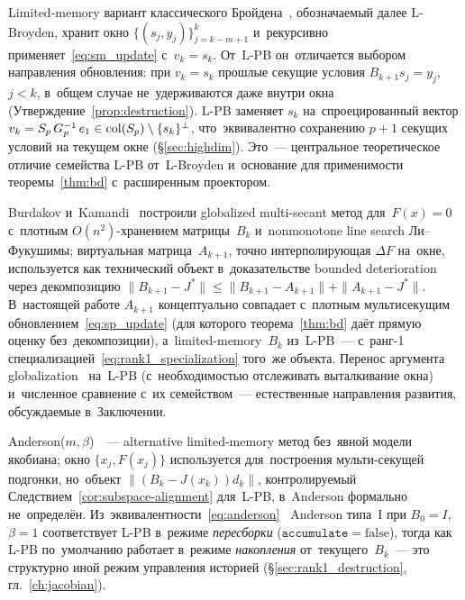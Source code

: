 \begin{remark}\label{rem:lpb_vs_lbroyden}
Limited-memory вариант классического Бройдена~\cite{byrd1994}, обозначаемый
далее L-Broyden, хранит окно $\{(s_j,y_j)\}_{j=k-m+1}^{k}$ и~рекурсивно
применяет~\eqref{eq:sm_update} с~$v_k=s_k$. От~L-PB он~отличается выбором
направления обновления: при $v_k=s_k$ прошлые секущие условия
$B_{k+1} s_j = y_j$, $j<k$, в~общем случае не~удерживаются даже внутри
окна (Утверждение~\ref{prop:destruction}). L-PB заменяет $s_k$ на~спроецированный
вектор $v_k = S_p\,G_p^{-1}\,e_1\in\operatorname{col}(S_p)\setminus\{s_k\}^{\perp}$,
что~эквивалентно сохранению $p+1$ секущих условий на текущем окне
(\S\ref{sec:highdim}). Это~--- центральное теоретическое отличие
семейства L-PB от~L-Broyden и~основание для применимости
теоремы~\ref{thm:bd} с~расширенным проектором.
\end{remark}

\begin{remark}\label{rem:lpb_vs_burdakov}
Burdakov и~Kamandi~\cite{burdakov2018} построили globalized multi-secant
метод для~$F(x)=0$ с~плотным $O(n^2)$-хранением матрицы~$B_k$ и~nonmonotone
line search Ли--Фукушимы; виртуальная матрица~$A_{k+1}$, точно
интерполирующая $\Delta F$ на~окне, используется как технический объект
в~доказательстве bounded deterioration через декомпозицию
$\|B_{k+1}-J^*\|\le \|B_{k+1}-A_{k+1}\| + \|A_{k+1}-J^*\|$. В~настоящей
работе $A_{k+1}$ концептуально совпадает с~плотным мультисекущим
обновлением~\eqref{eq:sp_update} (для которого теорема~\ref{thm:bd} даёт
прямую оценку без~декомпозиции), а~limited-memory~$B_k$ из~L-PB~---
с~ранг-1 специализацией~\eqref{eq:rank1_specialization} того~же объекта.
Перенос аргумента globalization~\cite{burdakov2018}
на~L-PB (с~необходимостью отслеживать выталкивание окна) и~численное
сравнение с~их семейством~--- естественные направления развития,
обсуждаемые в~Заключении.
\end{remark}

\begin{remark}\label{rem:lpb_vs_anderson}
Anderson($m,\beta$)~\cite{anderson1965,walker2011,toth2015}~--- alternative
limited-memory метод без~явной модели якобиана; окно $\{x_j,F(x_j)\}$
используется для~построения мульти-секущей подгонки, но~объект $\|(B_k-J(x_k))d_k\|$,
контролируемый Следствием~\ref{cor:subspace-alignment} для~L-PB, в~Anderson
формально не~определён. Из~эквивалентности~\eqref{eq:anderson}~\cite{walker2011,fang2009}
Anderson типа~I при $B_0=I$, $\beta=1$ соответствует L-PB в~режиме
\emph{пересборки} ($\mathtt{accumulate}=\text{false}$), тогда как L-PB
по~умолчанию работает в~режиме \emph{накопления} от~текущего~$B_k$~--- это
структурно иной режим управления историей (\S\ref{sec:rank1_destruction},
гл.~\ref{ch:jacobian}).
\end{remark}

